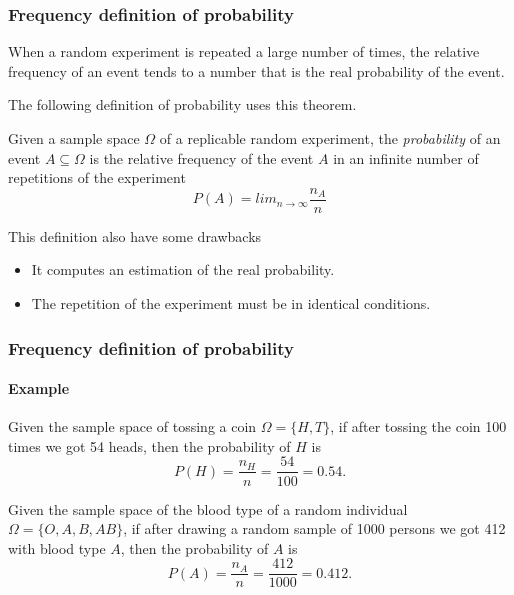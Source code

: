 \begin{frame}
\frametitle{Frequency definition of probability}
\begin{theorem}
When a random experiment is repeated a large number of times, the relative frequency of an event tends to a number that
is the real probability of the event.
\end{theorem}

The following definition of probability uses this theorem.
\begin{definition}
Given a sample space $\Omega$ of a replicable random experiment, the \emph{probability} of an event $A\subseteq \Omega$
is the relative frequency of the event $A$ in an infinite number of repetitions of the experiment 
\[
P(A) = lim_{n\rightarrow \infty}\frac{n_A}{n}
\]
\end{definition}

This definition also have some drawbacks
\begin{itemize}
\item It computes an estimation of the real probability. %
\item The repetition of the experiment must be in identical conditions.
\end{itemize}
\end{frame}


\begin{frame}
\frametitle{Frequency definition of probability}
\framesubtitle{Example}
Given the sample space of tossing a coin $\Omega=\{H,T\}$, if after tossing the coin 100 times we got 54 heads, then the
probability of $H$ is
\[
P(H) = \frac{n_H}{n} = \frac{54}{100} = 0.54.
\]

Given the sample space of the blood type of a random individual $\Omega=\{O,A,B,AB\}$, if after drawing a random sample
of 1000 persons we got 412 with blood type $A$, then the probability of $A$ is 
\[
P(A) = \frac{n_A}{n} = \frac{412}{1000} = 0.412.
\]
\end{frame}


